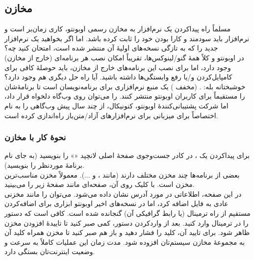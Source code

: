 \subsection[مخازن ppa]{مخازن }
مسلماً راه پیداکردن یک نرم‌افزار به مخازن رسمی اوبونتو، کاری زمان‌بر است و نرم‌افزار باید سودمند و کارا بودن خود را ثابت کرده باشد. اما اگر بخواهید یک نرم‌افزار جدید را که به تازگی نسخه‌های اولیهٔ آن منتشر شده است، امتحان کنید چه؟\\
در اوبونتو و کلاً همهٔ گنو/لینوکس‌ها، تقریباً امکان نصب هر برنامه‌ای (خارج از مخازن) وجود دارد، اما برای نصب این برنامه‌های خارج از مخازن، باید حوصلهٔ کافی برای کامپایل‌کردن و/یا رفع وابستگی‌ها داشته باشید. آیا راه حل دیگری هم وجود دارد؟\\
خوشبختانه بله: .  (مخفف ) یک منبع نرم‌افزاری برای برنامه‌نویسان است تا برنامهٔ‌شان را مستقیماً برای کاربران اوبونتو منتشر کنند.  را می‌توان روی وب‌گاه دلخواه قرار داد، اما شرکت پشتیبانی‌کنندهٔ اوبونتو، کنونیکال، از چند سال پیش وب‌گاهی را به نام  اختصاصاً برای میزبانی  برای نرم‌افزارهای آزاد/متن‌باز راه‌اندازی کرده است.\\

\subsubsection[نحوهٔ کار با مخازن ppa]{نحوهٔ کار با مخازن }
برای پیداکردن یک ، در کادر جست‌وجوی صفحهٔ اصلی لانچپد «» را بنویسید (به جای  نام برنامهٔ موردنظر را بنویسید).\\
بعضی از برنامه‌ها چند مخزن مختلف دارند (مانند ،  و ...). معمولاً مخزن  مناسب‌ترین مخزن است. با کلیک روی آن، صفحه‌ای مانند صفحهٔ زیر را می‌بینید.\\
در این صفحه، اطلاعاتی در مورد آدرس  نشان داده می‌شود. می‌توان  را مانند مخزنی عادی به فایل  اضافه کرد، اما در نسخه‌های اخیر اوبونتو ابزاری برای اضافه‌کردن مستقیم  از راه ترمینال (یا رابط گرافیکی آن) گنجانده شده است. کافی است که دستور  را در ترمینال وارد کنید. بعد از واردکردن دستور، کمی صبر کنید تا تاییدهٔ افزودن مخزن ظاهر شود. برای تایید آن، کلید  را فشار دهید و باز هم صبر کنید تا مخزن همراه کلید آن به مجموعهٔ مخازن سیستم‌تان افزوده شود. مدت زمان این عملیات کاملاً به سرعت و وضعیت اینترنت‌تان بستگی دارد.

